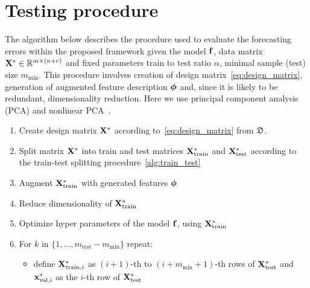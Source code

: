 \documentclass[conference]{IEEEtran}
\begin{document}
\section{Testing procedure}
The algorithm below describes the procedure used to evaluate the forecasting errors within the proposed framework given the model ${\mathbf{f}}$,  data matrix ${\mathbf{X}}^{*} \in \mathbb{R}^{m\times(n+r)}$ and fixed parameters train to test ratio $\alpha$, minimal sample (test) size $m_{\min}$. This procedure involves creation of design matrix~\eqref{eq:design_matrix}, generation of augmented feature description ${\boldsymbol{\phi}}$ and, since it is likely to be redundant, dimensionality reduction. Here we use principal component analysis (PCA) and nonlinear PCA~\cite{}.
\begin{enumerate}[1)]
\item Create design matrix ${\mathbf{X}}^{*}$ according to~\eqref{eq:design_matrix} from ${\mathfrak{D}}$.  
\item Split matrix ${\mathbf{X}}^{*}$ into train and test matrices ${\mathbf{X}}^{*}_{\text{train}}$ and ${\mathbf{X}}^{*}_{\text{test}}$ 
according to the train-test splitting procedure~\ref{alg:train_test}\;
\item Augment ${\mathbf{X}}^{*}_{\text{train}}$ with generated features ${\boldsymbol{\phi}}$\;
\item Reduce dimensionality of ${\mathbf{X}}^{*}_{\text{train}}$ \;
\item Optimize hyper parameters of the model ${\mathbf{f}}$, using ${\mathbf{X}}^{*}_{\text{train}}$\;
\item
For $k$ in $\{1, \dots,  m_{\text{test}} - m_{\min}\}$ repeat:
\begin{itemize}
\item define ${\mathbf{X}}^{*}_{\text{train}, i}$ as $(i+1)$-th to $(i+ m_{\min} + 1)$-th rows of ${\mathbf{X}}^{*}_{\text{test}}$ and
  ${\mathbf{x}}^{*}_{\text{val}, i}$ as the $i$-th row of ${\mathbf{X}}^{*}_{\text{test}}$\;


\end{itemize}
\end{enumerate}
\end{document}
